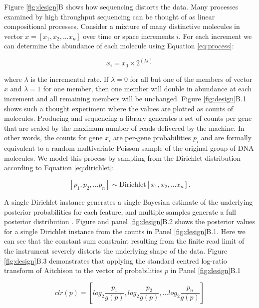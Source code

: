 \documentclass[article]{ajs}\usepackage[]{graphicx}\usepackage[]{color}
\begin{document}
Figure \ref{fig:design}B shows how sequencing distorts the data. Many processes examined by high throughput sequencing can be thought of as linear compositional processes. Consider a mixture of many distinctive molecules in vector $x=[x_1, x_2, ... x_n]$ over time or space increments $i$. For each increment we can determine the abundance of each molecule using Equation \ref{eq:process}:

\begin{equation}\label{eq:process}x_i = x_0 \times 2^{(\lambda  i)}\end{equation}

where $\lambda$ is the incremental rate. If $\lambda = 0$ for all but one of  the members of vector $x$ and $\lambda = 1$ for one member, then one member will double in abundance at each increment and all remaining members will be unchanged. Figure \ref{fig:design}B.1 shows such a thought experiment where the values are plotted as counts of molecules.  Producing and sequencing a library generates a set of counts per gene that are scaled by the maximum number of reads delivered by the machine. In other words, the counts for gene $x_i$ are per-gene probabilities $p_i$ and are formally equivalent to a random multivariate Poisson sample of the original group of DNA molecules. We model this process by sampling from the Dirichlet distribution according to Equation \ref{eq:dirichlet}:

\begin{equation}\label{eq:dirichlet} [p_1, p_2, ...p_n] \sim \mathrm{Dirichlet}[x_1, x_2, ... x_n].\end{equation}

A single Dirichlet instance generates a single Bayesian estimate of the underlying posterior probabilities for each feature, and multiple samples generate a full posterior distribution \citep{Holmes:2012,La-Rosa:2012,fernandes:2013}. Figure and panel \ref{fig:design}B.2 shows the posterior values for a single Dirichlet instance from the counts in Panel \ref{fig:design}B.1. Here we can see that the  constant sum constraint resulting from the finite read limit of the  instrument severely distorts the underlying shape of the data.  Figure \ref{fig:design}B.3 demonstrates that applying the standard centred log-ratio transform of Aitchison \citeyear{Aitchison:1986} to the vector of probabilities $p$ in Panel \ref{fig:design}B.1 

\begin{equation}\label{eq:clr}clr(p) = [log_2\frac{p_1}{g(p)},log_2\frac{p_2}{g(p)}, ... log_2\frac{p_n}{g(p)} ] \end{equation}
\end{document}
